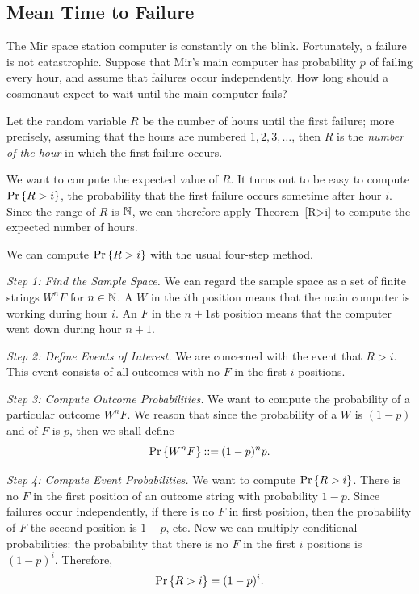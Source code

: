\documentclass[11pt,twoside]{article}
\begin{document}
\subsection{Mean Time to Failure}

The Mir space station computer is constantly on the blink.  Fortunately, a
failure is not catastrophic.  Suppose that Mir's main computer has
probability $p$ of failing every hour, and assume that failures occur
independently.  How long should a cosmonaut expect to wait until the main
computer fails?

Let the random variable $R$ be the number of hours until the first
failure; more precisely, assuming that the hours are numbered $1, 2, 3,
\ldots$, then $R$ is the \emph{number of the hour} in which the first
failure occurs.

We want to compute the expected value of $R$.  It turns out to be easy to
compute $\mathop{\textup{Pr}}\nolimits\left\{R > i\right\}$, the probability that the first failure occurs
sometime after hour $i$.  Since the range of $R$ is $\mathbb{N}$, we can
therefore apply Theorem~\ref{R>i} to compute the expected number of hours.

We can compute $\mathop{\textup{Pr}}\nolimits\left\{R > i\right\}$ with the usual four-step method.

{\em Step 1: Find the Sample Space.} We can regard the sample space as a
set of finite strings $W^nF$ for $n \in \mathbb{N}$.  A $W$ in the $i$th
position means that the main computer is working during hour $i$.  An $F$
in the $n+1$st position means that the computer went down during hour
$n+1$.

{\em Step 2: Define Events of Interest.} We are concerned with the
event that $R > i$.  This event consists of all outcomes with no $F$
in the first $i$ positions.

{\em Step 3: Compute Outcome Probabilities.} We want to compute the
probability of a particular outcome $W^nF$.  We reason that since the
probability of a $W$ is $(1-p)$ and of $F$ is $p$, then we shall define
\[
\mathop{\textup{Pr}}\nolimits\left\{W^nF\right\} \mathbin{::=} (1-p)^np.
\]

{\em Step 4: Compute Event Probabilities.}  We want to compute $\mathop{\textup{Pr}}\nolimits\left\{R >
i\right\}$.  There is no $F$ in the first position of an outcome string with
probability $1-p$.  Since failures occur independently, if there is no $F$
in first position, then the probability of $F$ the second position is
$1-p$, etc.  Now we can multiply conditional probabilities: the
probability that there is no $F$ in the first $i$ positions is $(1-p)^i$.
Therefore,
\begin{equation}\label{pR>i}
\mathop{\textup{Pr}}\nolimits\left\{R > i\right\} = (1-p)^i.
\end{equation}
\end{document}
